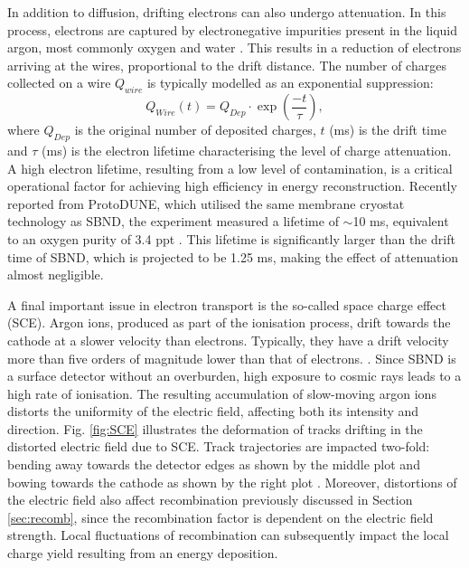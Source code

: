 In addition to diffusion, drifting electrons can also undergo attenuation.  
In this process, electrons are captured by electronegative impurities present in the liquid argon, most commonly oxygen and water \cite{protodune}.
This results in a reduction of electrons arriving at the wires, proportional to the drift distance. 
The number of charges collected on a wire $Q_{wire}$ is typically modelled as an exponential suppression:
\begin{equation}
	Q_{Wire} (t) = Q_{Dep} \cdot \exp\left(\frac{-t}{\tau}\right),
\label{eq:etime}
\end{equation}
where $Q_{Dep}$ is the original number of deposited charges, $t$ (ms) is the drift time and $\tau$ (ms) is the electron lifetime characterising the level of charge attenuation.
A high electron lifetime, resulting from a low level of contamination, is a critical operational factor for achieving high efficiency in energy reconstruction.
Recently reported from ProtoDUNE, which utilised the same membrane cryostat technology as SBND, the experiment measured a lifetime of $\sim$10 ms, equivalent to an oxygen purity of 3.4 ppt \cite{protodune}.
This lifetime is significantly larger than the drift time of SBND, which is projected to be 1.25 ms, making the effect of attenuation almost negligible. 



A final important issue in electron transport is the so-called space charge effect (SCE).
Argon ions, produced as part of the ionisation process, drift towards the cathode at a slower velocity than electrons.
Typically, they have a drift velocity more than five orders of magnitude lower than that of electrons. \cite{icarus_sce}.
Since SBND is a surface detector without an overburden, high exposure to cosmic rays leads to a high rate of ionisation.
The resulting accumulation of slow-moving argon ions distorts the uniformity of the electric field, affecting both its intensity and direction.
Fig. \ref{fig:SCE} illustrates the deformation of tracks drifting in the distorted electric field due to SCE.
Track trajectories are impacted two-fold: bending away towards the detector edges as shown by the middle plot and bowing towards the cathode as shown by the right plot \cite{SCE}.
Moreover, distortions of the electric field also affect recombination previously discussed in Section \ref{sec:recomb}, since the recombination factor is dependent on the electric field strength.
Local fluctuations of recombination can subsequently impact the local charge yield resulting from an energy deposition.

